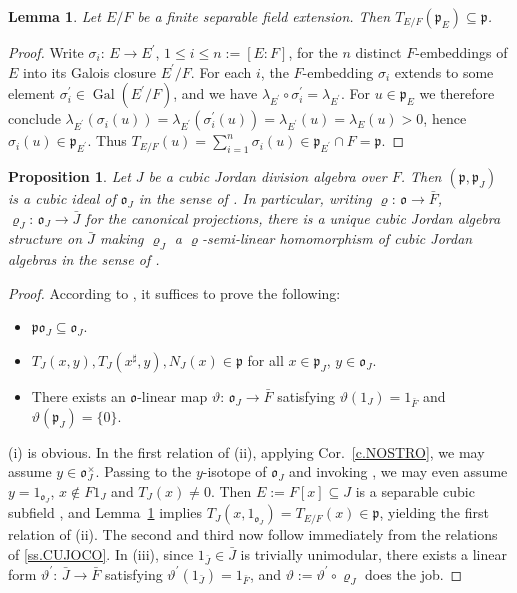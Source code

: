 \documentclass{amsart}
\newtheorem{lem}[equation]{Lemma}
\newtheorem{prop}[equation]{Proposition}
\theoremstyle{definition} %
\theoremstyle{remark} %
\DeclareMathOperator{\Gal}{Gal}
\newcommand{\mfo}{\mathfrak{o}}
\newcommand{\mfp}{\mathfrak{p}}
\renewcommand{\:}{\colon\,}
\numberwithin{equation}{section}
\begin{document}
\begin{lem} \label{l.FISETR}
Let $E/F$ be a finite separable field extension. Then $T_{E/F}(\mfp_E) \subseteq \mfp$.	
\end{lem}

\begin{proof}
Write $\sigma_i\:E \to E^\prime$, $1\le i\le n := [E:F]$, for the $n$ distinct $F$-embeddings of $E$ into its Galois closure $E^\prime/F$. For each $i$, the $F$-embedding $\sigma_i$ extends to some element $\sigma_i^\prime \in \Gal(E^\prime/F)$, and we have $\lambda_{E^\prime} \circ \sigma_i^\prime = \lambda_{E^\prime}$. For $u \in \mfp_E$ we therefore conclude $\lambda_{E^\prime}(\sigma_i(u)) = \lambda_{E^\prime}(\sigma_i^\prime(u)) = \lambda_{E^\prime}(u) = \lambda_E(u) > 0$, hence $\sigma_i(u) \in \mfp_{E^\prime}$. Thus $T_{E/F}(u) = \sum_{i=1}^n \sigma_i(u) \in \mfp_{E^\prime} \cap F = \mfp$.
\end{proof}	

\begin{prop} \label{p.FRECUI}
Let $J$ be a cubic Jordan division algebra over $F$. Then $(\mfp,\mfp_J)$ is a cubic ideal of $\mfo_J$ in the sense of \cite[Exc.~34.21]{MR4806163}. In particular, writing $\varrho\:\mfo \to \bar F$, $\varrho_J\:\mfo_J \to \bar J$ for the canonical projections, there is a unique cubic Jordan algebra structure on $\bar J$ making $\varrho_J$ a $\varrho$-semi-linear homomorphism of cubic Jordan algebras in the sense of \cite[34.10(b)]{MR4806163}.
\end{prop}

\begin{proof}
According to \cite[Exc.~34.21]{MR4806163}, it suffices to prove the following:
\begin{itemize}
\item [(i)] $\mfp\mfo_J \subseteq \mfo_J$.

\item [(ii)] $T_J(x,y), T_J(x^\sharp,y), N_J(x) \in \mfp$ for all $x \in \mfp_J$, $y \in \mfo_J$.

\item [(iii)] There exists an $\mfo$-linear map $\vartheta\:\mfo_J \to \bar F$ satisfying $\vartheta(1_J) = 1_{\bar F}$ and $\vartheta(\mfp_J) = \{0\}$.
\end{itemize}
(i) is obvious. In the first relation of (ii), applying Cor.~\ref{c.NOSTRO}, we may assume $y \in \mfo_J^\times$. Passing to the $y$-isotope of $\mfo_J$ and invoking \cite[(33.11.5)]{MR4806163}, we may even assume $y = 1_{\mfo_J}$, $x \notin F1_J$ and $T_J(x) \ne 0$. Then $E := F[x] \subseteq J$ is a separable cubic subfield \cite[Prop.~46.6]{MR4806163}, and Lemma~\ref{l.FISETR} implies $T_J(x,1_{\mfo_J})= T_{E/F}(x) \in \mfp$, yielding the first relation of (ii). The second and third now follow immediately from  the relations of \ref{ss.CUJOCO}. In (iii), since $1_{\bar J} \in \bar J$ is trivially unimodular, there exists a linear form $\vartheta^\prime\:\bar J \to \bar F$ satisfying $\vartheta^\prime(1_{\bar J}) = 1_{\bar F}$, and $\vartheta := \vartheta^\prime \circ \varrho_J$ does the job.
\end{proof}
\end{document}
